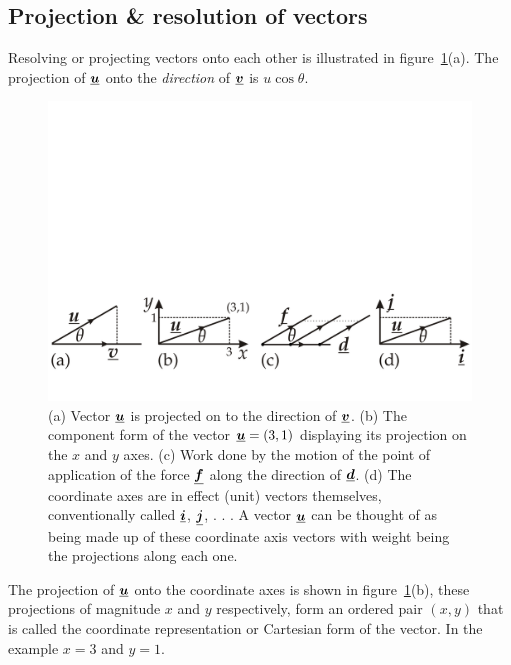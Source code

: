



\addtolength{\topmargin}{-0.7 cm}
\setlength{\columnsep}{22pt}


\subsection*{Projection \& resolution of vectors}
Resolving or projecting vectors onto each other is illustrated in
figure~\ref{fig:project-vectors}(a).  The projection of $\mathit{\underline{\boldsymbol{u}}}$ onto the \emph{direction} of $\mathit{\underline{\boldsymbol{v}}}$ is $u \cos\theta$.
\begin{figure}[h!]
\centering
\includegraphics[width=.95\linewidth]{../../figures/project-vectors.svg}
\caption{(a) Vector $\mathit{\underline{\boldsymbol{u}}}$ is projected on to the direction of $\mathit{\underline{\boldsymbol{v}}}$.  (b) The component form of the vector $\mathit{\underline{\boldsymbol{u}}} = (3,1)$ displaying its projection on the $x$ and $y$ axes. (c) Work done by the motion of the point of application of the force $\mathit{\underline{\boldsymbol{f}}}$ along the direction of $\mathit{\underline{\boldsymbol{d}}}$. (d) The coordinate axes are in effect (unit) vectors themselves, conventionally called $\mathit{\underline{\boldsymbol{i}}}$, $\mathit{\underline{\boldsymbol{j}}}$, . . . A vector $\mathit{\underline{\boldsymbol{u}}}$ can be thought of as being made up of these coordinate axis vectors with weight being the projections along each one. }\label{fig:project-vectors}
\end{figure}
The projection of $\mathit{\underline{\boldsymbol{u}}}$ onto the coordinate axes is shown in figure~\ref{fig:project-vectors}(b), these projections of magnitude $x$ and $y$ respectively, form an ordered pair $(x,y)$ that is called the coordinate representation or Cartesian form of the vector.  In the example $x=3$ and $y=1$.
